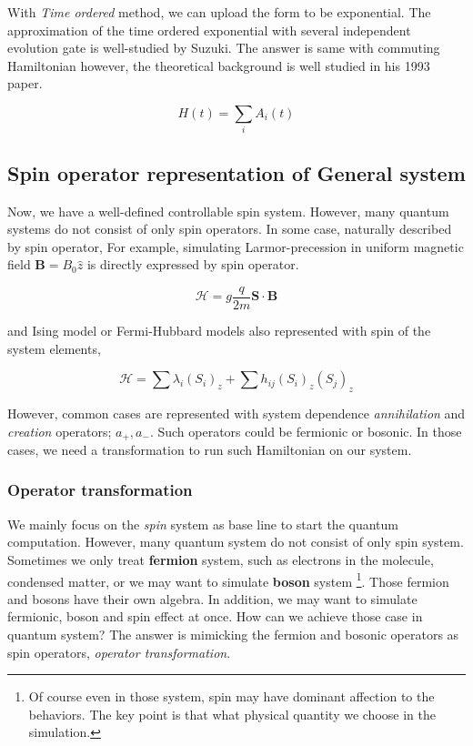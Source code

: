 With \textit{Time ordered} method, we can upload the form 
to be exponential. The approximation of the time ordered exponential 
with several independent evolution gate is well-studied by Suzuki\cite{suzuki_general_1993}.
The answer is same with commuting Hamiltonian however, 
the theoretical background is well studied in his 1993 paper.

\begin{equation}
    H(t) = \sum_{i} A_i (t)
\end{equation}



\subsection{Spin operator representation of General system}

Now, we have a well-defined controllable spin system. However, many quantum systems do not consist of only spin operators.
In some case, naturally described by spin operator, 
For example, simulating Larmor-precession in uniform magnetic field $\mathbf{B} = B_0 \hat{z}$ is directly expressed by spin operator.

\begin{equation}
    \mathcal{H} = g \frac{q}{2m} \mathbf{S} \cdot \mathbf{B}
\end{equation}

and Ising model or Fermi-Hubbard models also represented with spin of the system elements,%

\begin{equation}
    \mathcal{H} = \sum \lambda_i (S_i)_z + \sum h_{ij} (S_i)_z (S_j)_z
\end{equation}

However, common cases are represented with
system dependence \textit{annihilation} and \textit{creation} operators; $a_+, a_-$.
Such operators could be fermionic or bosonic. 
In those cases, we need a transformation to run such Hamiltonian on our system.


\subsubsection{Operator transformation}

We mainly focus on the \textit{spin} system 
as base line to start the quantum computation.
However, many quantum system do not consist of only spin system.
Sometimes we only treat \textbf{fermion} system, such as electrons in the molecule,
 condensed matter, or we may want to simulate \textbf{boson} system
\footnote{Of course even in those system, spin may have dominant affection 
to the behaviors. The key point is that what physical quantity we choose in the simulation.
}.
Those fermion and bosons have their own algebra.
In addition, we may want to simulate fermionic, boson and spin effect 
at once. How can we achieve those case in quantum system?
The answer is mimicking the fermion and bosonic operators 
as spin operators, \textit{operator transformation}.

